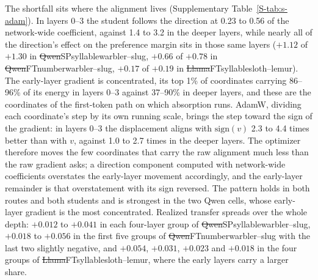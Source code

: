 The shortfall sits where the alignment lives (Supplementary Table~\ref{S-tab:s-adam}). In layers 0--3 the student follows the direction at 0.23 to 0.56 of the network-wide coefficient, against 1.4 to 3.2 in the deeper layers, while nearly all of the direction's effect on the preference margin sits in those same layers ($+1.12$ of $+1.30$ in \st{Qwen}{SP}{syllable}{warbler--slug}, $+0.66$ of $+0.78$ in \st{Qwen}{FT}{number}{warbler--slug}, $+0.17$ of $+0.19$ in \st{Llama}{FT}{syllable}{sloth--lemur}). The early-layer gradient is concentrated, its top 1\% of coordinates carrying 86--96\% of its energy in layers 0--3 against 37--90\% in deeper layers, and these are the coordinates of the first-token path on which absorption runs. AdamW, dividing each coordinate's step by its own running scale, brings the step toward the sign of the gradient: in layers 0--3 the displacement aligns with $\mathrm{sign}(v)$ 2.3 to 4.4 times better than with $v$, against 1.0 to 2.7 times in the deeper layers. The optimizer therefore moves the few coordinates that carry the raw alignment much less than the raw gradient asks; a direction component computed with network-wide coefficients overstates the early-layer movement accordingly, and the early-layer remainder is that overstatement with its sign reversed. The pattern holds in both routes and both students and is strongest in the two Qwen cells, whose early-layer gradient is the most concentrated. Realized transfer spreads over the whole depth: $+0.012$ to $+0.041$ in each four-layer group of \st{Qwen}{SP}{syllable}{warbler--slug}, $+0.018$ to $+0.056$ in the first five groups of \st{Qwen}{FT}{number}{warbler--slug} with the last two slightly negative, and $+0.054$, $+0.031$, $+0.023$ and $+0.018$ in the four groups of \st{Llama}{FT}{syllable}{sloth--lemur}, where the early layers carry a larger share.

